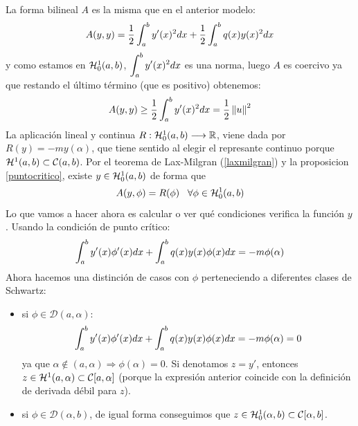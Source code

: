 \begin{center}
\end{center}
La forma bilineal $A$ es la misma que en el anterior modelo:
\[
A(y,y)=\frac{1}{2}\integral{a}{b}{y'(x)^2dx}+\frac{1}{2}\integral{a}{b}{q(x)y(x)^2dx}
\]
y como estamos en $\sobolevcero{1}$, $\integral{a}{b}{y'(x)^2dx}$ es una norma, luego $A$ es coercivo ya que restando el último término (que es positivo) obtenemos:
\[
A(y,y)\geq \frac{1}{2}\integral{a}{b}{y'(x)^2dx} = \frac{1}{2}\norm{u}^2
\] 
La aplicación lineal y continua $\funcion{R}{\sobolevcero{1}}{\R}$, viene dada por $R(y)=-my(\alpha)$, que tiene sentido al elegir el represante continuo porque $\sobolev{1}\subset \mathcal{C}(a,b)$. Por el teorema de Lax-Milgran (\ref{laxmilgran}) y la proposicion \ref{puntocritico}, existe $y\in\sobolevcero{1}$ de forma que
\[
A(y,\phi)=R(\phi) \espacio \forall \phi\in\sobolevcero{1}
\]
Lo que vamos a hacer ahora es calcular o ver qué condiciones verifica la función $y$. Usando la condición de punto crítico:
\begin{equation}
\label{formulageneral}
\integral{a}{b}{y'(x)\phi'(x)dx}+\integral{a}{b}{q(x)y(x)\phi(x)dx}=-m\phi(\alpha)
\end{equation}
Ahora hacemos una distinción de casos con $\phi$ perteneciendo a diferentes clases de Schwartz:
\begin{itemize}[-]
\item si $\phi\in\mathcal{D}(a,\alpha)$:
\[
\integral{a}{b}{y'(x)\phi'(x)dx}+\integral{a}{b}{q(x)y(x)\phi(x)dx}=-m\phi(\alpha)=0
\]
ya que $\alpha\notin(a,\alpha) \Rightarrow \phi(\alpha)=0$. Si denotamos $z=y'$, entonces $z\in\sobolev[a,\alpha]{1}\subset\mathcal{C}[a,\alpha]$ (porque la expresión anterior coincide con la definición de derivada débil para $z$).
\item si $\phi\in\mathcal{D}(\alpha,b)$, de igual forma conseguimos que $z\in\sobolevcero[\alpha,b]{1}\subset\mathcal{C}[\alpha,b]$. 
\end{itemize}
